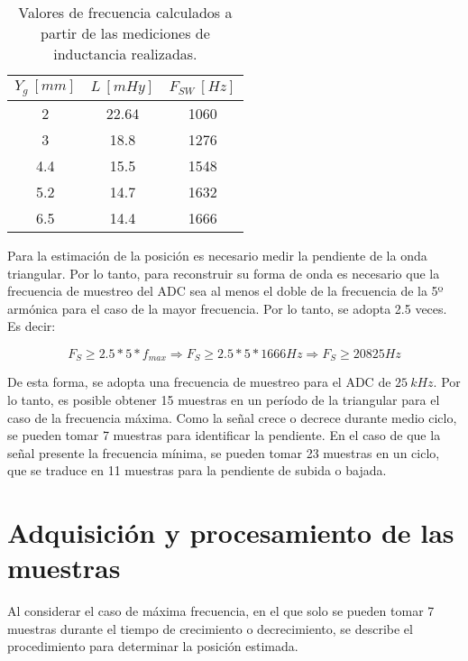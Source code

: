 \begin{table}[H]
	\begin{center}
		\begin{tabular}{| c | c | c |}
			\hline
			$Y_g\:[mm]$ & $L\:[mHy]$ & $F_{SW}\:[Hz]$\\ \hline
			2 & 22.64 & 1060\\ \hline
			3 & 18.8 & 1276\\ \hline
			4.4 & 15.5 & 1548\\ \hline
			5.2 & 14.7 & 1632\\ \hline		
			6.5 & 14.4 & 1666\\ \hline
		\end{tabular}
		\caption{Valores de frecuencia calculados a partir de las mediciones de inductancia realizadas.}
		\label{frecuencias-calculadas}
	\end{center}
\end{table}


\noindent Para la estimación de la posición es necesario medir la pendiente de la onda triangular. Por lo tanto, para reconstruir su forma de onda es necesario que la frecuencia de muestreo del ADC sea al menos el doble de la frecuencia de la 5º armónica para el caso de la mayor frecuencia. Por lo tanto, se adopta 2.5 veces. Es decir:

\begin{equation} 
	F_S \geq 2.5 * 5 * f_{max} \Rightarrow  F_S \geq 2.5 * 5 * 1666 Hz \Rightarrow F_S \geq 20825 Hz
\end{equation}

\noindent De esta forma, se adopta una frecuencia de muestreo para el ADC de  $25 \:kHz$. Por lo tanto, es posible obtener 15 muestras en un período de la triangular para el caso de la frecuencia máxima. Como la señal crece o decrece durante medio ciclo, se pueden tomar 7 muestras para identificar la pendiente. En el caso de que la señal presente la frecuencia mínima, se pueden tomar 23 muestras en un ciclo, que se traduce en 11 muestras para la pendiente de subida o bajada. 


\section{Adquisición y procesamiento de las muestras}

\noindent Al considerar el caso de máxima frecuencia, en el que solo se pueden tomar 7 muestras durante el tiempo de crecimiento o decrecimiento, se describe el procedimiento para determinar la posición estimada.


